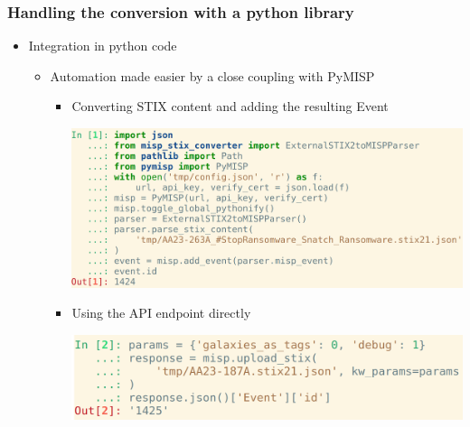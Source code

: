\begin{frame}
    \frametitle{Handling the conversion with a python library}
    \begin{itemize}
        \item Integration in python code
        \begin{itemize}
            \item Automation made easier by a close coupling with PyMISP
            \begin{itemize}
                \item Converting STIX content and adding the resulting Event
                \begin{center}
                    \includegraphics[scale=0.15]{images/PyMISPaddEvent.png}
                \end{center}
                \item Using the API endpoint directly
                \begin{center}
                    \includegraphics[scale=0.15]{images/PyMISPuploadSTIX.png}
                \end{center}
            \end{itemize}
        \end{itemize}
    \end{itemize}
\end{frame}

